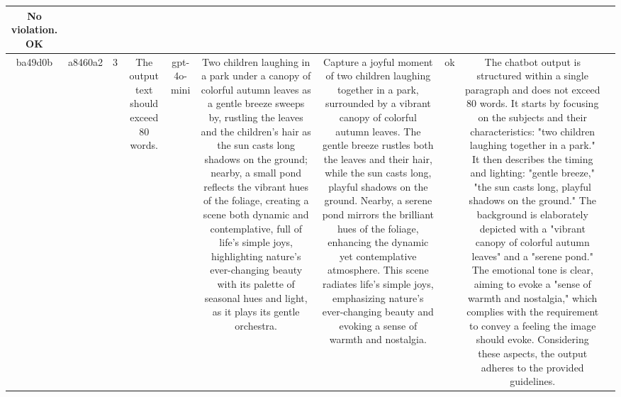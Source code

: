 \begin{table}[h!]
\begin{tabular}{|c|c|c|c|c|c|c|c|c|c|}
No violation.
OK & \\
\hline
ba49d0b & a8460a2 & 3 & The output text should exceed 80 words. & gpt-4o-mini & Two children laughing in a park under a canopy of colorful autumn leaves as a gentle breeze sweeps by, rustling the leaves and the children's hair as the sun casts long shadows on the ground; nearby, a small pond reflects the vibrant hues of the foliage, creating a scene both dynamic and contemplative, full of life's simple joys, highlighting nature's ever-changing beauty with its palette of seasonal hues and light, as it plays its gentle orchestra. & Capture a joyful moment of two children laughing together in a park, surrounded by a vibrant canopy of colorful autumn leaves. The gentle breeze rustles both the leaves and their hair, while the sun casts long, playful shadows on the ground. Nearby, a serene pond mirrors the brilliant hues of the foliage, enhancing the dynamic yet contemplative atmosphere. This scene radiates life's simple joys, emphasizing nature's ever-changing beauty and evoking a sense of warmth and nostalgia. & ok & The chatbot output is structured within a single paragraph and does not exceed 80 words. It starts by focusing on the subjects and their characteristics: "two children laughing together in a park." It then describes the timing and lighting: "gentle breeze," "the sun casts long, playful shadows on the ground." The background is elaborately depicted with a "vibrant canopy of colorful autumn leaves" and a "serene pond." The emotional tone is clear, aiming to evoke a "sense of warmth and nostalgia," which complies with the requirement to convey a feeling the image should evoke. Considering these aspects, the output adheres to the provided guidelines. 


\end{tabular}
\end{table}
